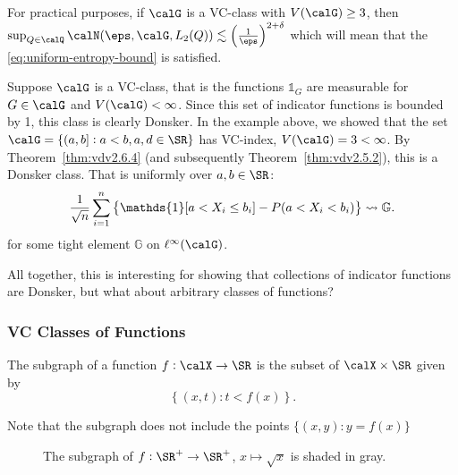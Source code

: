 \begin{remark*}
	For practical purposes, if \(\calG\) is a VC-class with \(V(\calG) \geq 3\), then \(\sup_{Q\in\calQ}\calN(\eps,\calG,L_2(Q)) \lesssim \left(\frac{1}{\eps}\right)^{2+ \delta}\) which will mean that the \eqref{eq:uniform-entropy-bound} is satisfied. 
\end{remark*}

\begin{example*}
	Suppose \(\calG\) is a VC-class, that is the functions \(\mathds{1}_G\) are measurable for \(G \in \calG\) and \(V(\calG) <\infty\). Since this set of indicator functions is bounded by 1, this class is clearly Donsker. In the example above, we showed that the set \(\calG = \{(a,b]: a< b, a,d \in \SR\}\) has VC-index, \(V(\calG) = 3 < \infty\). By Theorem~\ref{thm:vdv2.6.4} (and subsequently Theorem~\ref{thm:vdv2.5.2}), this is a Donsker class. That is uniformly over \(a,b\in\SR\):
	\[
		\frac{1}{\sqrt{n}}\sum_{i=1}^n \left\{\mathds{1}[a < X_i \leq b_i] - P(a < X_i < b_i)\right\} \wcov \mathbb{G}
	.\] 
	for some tight element \(\mathbb{G}\) on \(\ell^\infty(\calG)\).
\end{example*}

All together, this is interesting for showing that collections of indicator functions are Donsker, but what about arbitrary classes of functions?

\subsubsection{VC Classes of Functions}

\begin{definition}[Subgraph]
	\label{def:subgraph}
	The subgraph of a function \(f:\calX\to\SR\) is the subset of \(\calX\times\SR\) given by 
	\[
		\left\{(x,t): t< f(x)\right\}
	.\] 
\end{definition}
\begin{remark*}
	Note that the subgraph does not include the points \(\{(x,y): y=f(x)\} \)
\end{remark*}
\begin{figure}[htpb]
	\centering
	\caption{The subgraph of \(f: \SR^+ \to \SR^+\), \(x\mapsto \sqrt{x}\) is shaded in gray. }%
	\label{fig:subgraph}
\end{figure}

